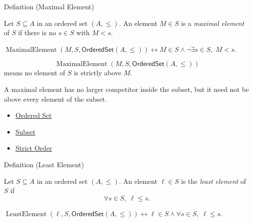 \begin{definitionbox}{Definition (Maximal Element)}
\begin{definition}\label{def:order-maximal-element}
Let $S \subseteq A$ in an ordered set $(A,\leq)$. An element $M \in S$ is a
\emph{maximal element} of $S$ if there is no $s \in S$ with $M < s$.
\end{definition}
\end{definitionbox}

\begin{remark*}
$\operatorname{MaximalElement}(M,S,\mathsf{OrderedSet}(A,\leq))
\leftrightarrow M\in S\wedge \neg\exists s\in S,\;M<s$.
\end{remark*}

\begin{remark*}
\[
  \operatorname{MaximalElement}(M,S,\mathsf{OrderedSet}(A,\leq))
\] means no
element of $S$ is strictly above $M$.
\end{remark*}

\begin{remark*}[Interpretation]
A maximal element has no larger competitor inside the subset, but it need not
be above every element of the subset.
\end{remark*}

\begin{dependencies}
\begin{itemize}
  \item \hyperref[def:ordered-set]{Ordered Set}
  \item \hyperref[def:subset]{Subset}
  \item \hyperref[def:strict-order]{Strict Order}
\end{itemize}
\end{dependencies}

\begin{definitionbox}{Definition (Least Element)}
\begin{definition}\label{def:order-least-element}
Let $S \subseteq A$ in an ordered set $(A,\leq)$. An element $\ell \in S$ is
the \emph{least element} of $S$ if
\[
\forall s \in S,\; \ell \leq s.
\]
\end{definition}
\end{definitionbox}

\begin{remark*}
$\operatorname{LeastElement}(\ell,S,\mathsf{OrderedSet}(A,\leq))
\leftrightarrow \ell\in S\wedge \forall s\in S,\;\ell\leq s$.
\end{remark*}

